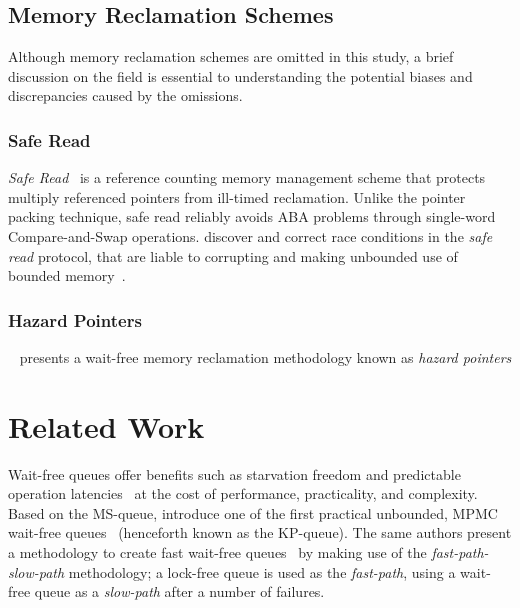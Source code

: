 \subsection{Memory Reclamation Schemes}
Although memory reclamation schemes are omitted in this study, a brief discussion
on the field is essential to understanding the potential biases and discrepancies caused
by the omissions.

\subsubsection{Safe Read}
\emph{Safe Read}~\citep{valois1994queues,valois1995datastructures} 
is a reference counting memory management scheme that protects multiply referenced
pointers from ill-timed reclamation. 
Unlike the pointer packing technique, safe read reliably avoids ABA problems through
single-word Compare-and-Swap operations. \citeauthor{michael1995correction} discover
and correct race conditions in the \emph{safe read} protocol, that are liable to
corrupting and making unbounded use of bounded memory~\citep{michael1995correction}.

\subsubsection{Hazard Pointers}
\citeauthor{michael2004hazard}~\citep{michael2004hazard} presents a wait-free
memory reclamation methodology known as \emph{hazard pointers}

\section{Related Work}
Wait-free queues offer benefits such as starvation freedom and predictable
operation latencies \textemdash~at the cost of performance, practicality, and complexity.
Based on the MS-queue, \citeauthor{kogan2011wait} introduce one of the first practical unbounded, MPMC
wait-free queues~\citep{kogan2011wait} (henceforth known as the KP-queue). The
same authors present a methodology to create fast wait-free queues~\citep{kogan2012methodology} by
making use of the \emph{fast-path-slow-path} methodology; a lock-free queue is
used as the \emph{fast-path}, using a wait-free queue as a \emph{slow-path}
after a number of failures.

